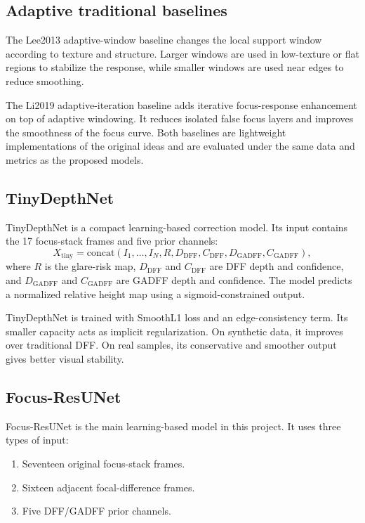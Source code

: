 \documentclass[11pt,a4paper]{article}
\begin{document}
\subsection{Adaptive traditional baselines}

The Lee2013 adaptive-window baseline changes the local support window according to texture and structure. Larger windows are used in low-texture or flat regions to stabilize the response, while smaller windows are used near edges to reduce smoothing.

The Li2019 adaptive-iteration baseline adds iterative focus-response enhancement on top of adaptive windowing. It reduces isolated false focus layers and improves the smoothness of the focus curve. Both baselines are lightweight implementations of the original ideas and are evaluated under the same data and metrics as the proposed models.

\subsection{TinyDepthNet}

TinyDepthNet is a compact learning-based correction model. Its input contains the 17 focus-stack frames and five prior channels:
\begin{equation}
X_{\mathrm{tiny}}=\mathrm{concat}(I_1,\ldots,I_N,R,D_{\mathrm{DFF}},C_{\mathrm{DFF}},D_{\mathrm{GADFF}},C_{\mathrm{GADFF}}),
\end{equation}
where \(R\) is the glare-risk map, \(D_{\mathrm{DFF}}\) and \(C_{\mathrm{DFF}}\) are DFF depth and confidence, and \(D_{\mathrm{GADFF}}\) and \(C_{\mathrm{GADFF}}\) are GADFF depth and confidence. The model predicts a normalized relative height map using a sigmoid-constrained output.

TinyDepthNet is trained with SmoothL1 loss and an edge-consistency term. Its smaller capacity acts as implicit regularization. On synthetic data, it improves over traditional DFF. On real samples, its conservative and smoother output gives better visual stability.

\subsection{Focus-ResUNet}

Focus-ResUNet is the main learning-based model in this project. It uses three types of input:
\begin{enumerate}
  \item Seventeen original focus-stack frames.
  \item Sixteen adjacent focal-difference frames.
  \item Five DFF/GADFF prior channels.
\end{enumerate}
\end{document}
